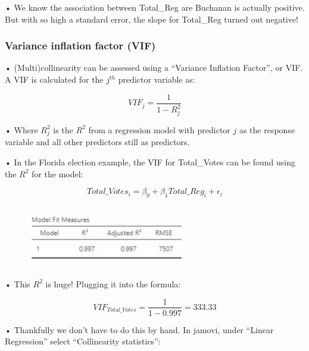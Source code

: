 \documentclass[
  letterpaper,
  DIV=11,
  numbers=noendperiod]{scrreprt}
\begin{document}
• We know the association between Total\_Reg are Buchanan is actually
positive. But with so high a standard error, the slope for Total\_Reg
turned out negative!

\hypertarget{variance-inflation-factor-vif}{%
\subsubsection{Variance inflation factor
(VIF)}\label{variance-inflation-factor-vif}}

• (Multi)collinearity can be assessed using a ``Variance Inflation
Factor'', or VIF. A VIF is calculated for the \(j^{th}\) predictor
variable as:

\[
VIF_j = \frac{1}{1-R^2_j}
\]

• Where \(R^2_j\) is the \(R^2\) from a regression model with predictor
\(j\) as the response variable and all other predictors still as
predictors.

• In the Florida election example, the VIF for Total\_Votes can be found
using the \(R^2\) for the model:

\[
Total\_Votes_i = \beta_0 + \beta_1Total\_Reg_i + \epsilon_i
\]

\begin{figure}

\includegraphics[width=2.79167in,height=\textheight]{images/mod4_pt1_29.png} \hfill{}

\end{figure}

\hfill\break
• This \(R^2\) is huge! Plugging it into the formula:

\[
VIF_{Total\_Votes}=\frac{1}{1-0.997} = 333.33
\]

• Thankfully we don't have to do this by hand. In jamovi, under ``Linear
Regression'' select ``Collinearity statistics'':
\end{document}
